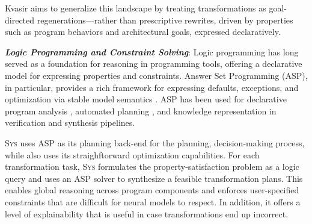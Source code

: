 \documentclass[sigplan]{acmart}
\newcommand{\sys}{{\scshape Sys}\xspace}
\newcommand{\heading}[1]{\vspace{2pt}\noindent\textbf{\emph{#1}}:\enspace}
\begin{document}
Kvasir aims to generalize this landscape by treating transformations as
goal-directed regenerations—rather than prescriptive rewrites, driven by
properties such as program behaviors and architectural goals, expressed declaratively.

\heading{Logic Programming and Constraint Solving}
Logic programming has long served as a foundation for reasoning in programming
tools, offering a declarative model for expressing properties and constraints.
Answer Set Programming (ASP), in particular, provides a rich framework for
expressing defaults, exceptions, and optimization via stable model semantics
\cite{Gelfond_2000, Gelfond_2002, Eiter_2009}. ASP has been used for
declarative program analysis \cite{benton2007interactive}, automated planning
\cite{nguyen2020explainable, son2022answersetplanningsurvey}, and knowledge
representation in verification and synthesis pipelines.

\sys uses ASP as its planning back-end for the planning, decision-making
process, while also uses its straighftorward optimization capabilities.
For each transformation task, \sys formulates the property-satisfaction problem as a logic query and uses an ASP solver to
synthesize a feasible transformation plans.
This enables global reasoning across program components and enforces
user-specified constraints that are difficult for neural models to respect.
In addition, it offers a level of explainability that is useful in case transformations end up incorrect.



\end{document}
